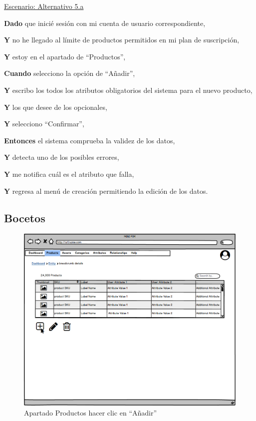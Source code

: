 \underline{Escenario: Alternativo 5.a}\par
\vspace{0.15cm}
\textbf{Dado} que inicié sesión con mi cuenta de usuario correspondiente,\par
\textbf{Y} no he llegado al límite de productos permitidos en mi plan de suscripción,\par
\textbf{Y} estoy en el apartado de \enquote{Productos},\par
\textbf{Cuando} selecciono la opción de \enquote{Añadir},\par
\textbf{Y} escribo los todos los atributos obligatorios del sistema para el nuevo producto,\par
\textbf{Y} los que desee de los opcionales,\par
\textbf{Y} selecciono \enquote{Confirmar},\par
\textbf{Entonces} el sistema comprueba la validez de los datos,\par
\textbf{Y} detecta uno de los posibles errores,\par
\textbf{Y} me notifica cuál es el atributo que falla,\par
\textbf{Y} regresa al menú de creación permitiendo la edición de los datos.\par
\vspace{0.20cm}

\newpage
\subsection{Bocetos}
\begin{figure}[H]
    \includegraphics[width=1\linewidth]{mockups/RF2.1_boceto1.png}
    \caption{Apartado Productos hacer clic en \enquote{Añadir}}
   \end{figure}
\vspace{1.0cm}

